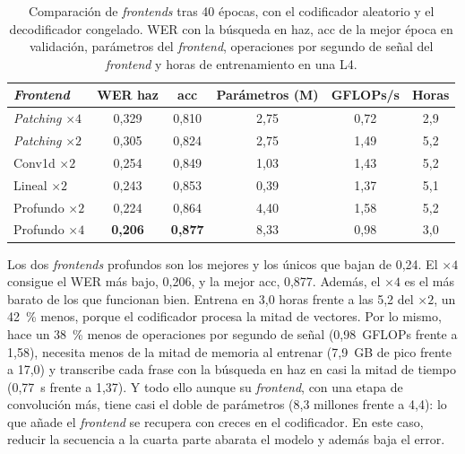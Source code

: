 \begin{table}[htbp]
  \centering
  \caption[Comparación de los frontends]{Comparación de \textit{frontends} tras 40 épocas, con el codificador aleatorio y el decodificador congelado. WER con la búsqueda en haz, acc de la mejor época en validación, parámetros del \textit{frontend}, operaciones por segundo de señal del \textit{frontend} y horas de entrenamiento en una L4.}
  \label{tab:res-frontends}
  \small
  \begin{tabular}{lccccc}
    \toprule
    \textbf{\textit{Frontend}} & \textbf{WER haz} & \textbf{acc} & \textbf{Parámetros (M)} & \textbf{GFLOPs/s} & \textbf{Horas} \\
    \midrule
    \textit{Patching} $\times 4$ & 0,329          & 0,810          & 2,75 & 0,72 & 2,9 \\
    \textit{Patching} $\times 2$ & 0,305          & 0,824          & 2,75 & 1,49 & 5,2 \\
    Conv1d $\times 2$            & 0,254          & 0,849          & 1,03 & 1,43 & 5,2 \\
    Lineal $\times 2$            & 0,243          & 0,853          & 0,39 & 1,37 & 5,1 \\
    Profundo $\times 2$          & 0,224          & 0,864          & 4,40 & 1,58 & 5,2 \\
    Profundo $\times 4$          & \textbf{0,206} & \textbf{0,877} & 8,33 & 0,98 & 3,0 \\
    \bottomrule
  \end{tabular}
\end{table}

Los dos \textit{frontends} profundos son los mejores y los únicos que bajan de 0,24. El $\times 4$ consigue el WER más bajo, 0,206, y la mejor acc, 0,877. Además, el $\times 4$ es el más barato de los que funcionan bien. Entrena en 3,0 horas frente a las 5,2 del $\times 2$, un 42~\% menos, porque el codificador procesa la mitad de vectores. Por lo mismo, hace un 38~\% menos de operaciones por segundo de señal (0,98~GFLOPs frente a 1,58), necesita menos de la mitad de memoria al entrenar (7,9~GB de pico frente a 17,0) y transcribe cada frase con la búsqueda en haz en casi la mitad de tiempo (0,77~s frente a 1,37). Y todo ello aunque su \textit{frontend}, con una etapa de convolución más, tiene casi el doble de parámetros (8,3 millones frente a 4,4): lo que añade el \textit{frontend} se recupera con creces en el codificador. En este caso, reducir la secuencia a la cuarta parte abarata el modelo y además baja el error.

